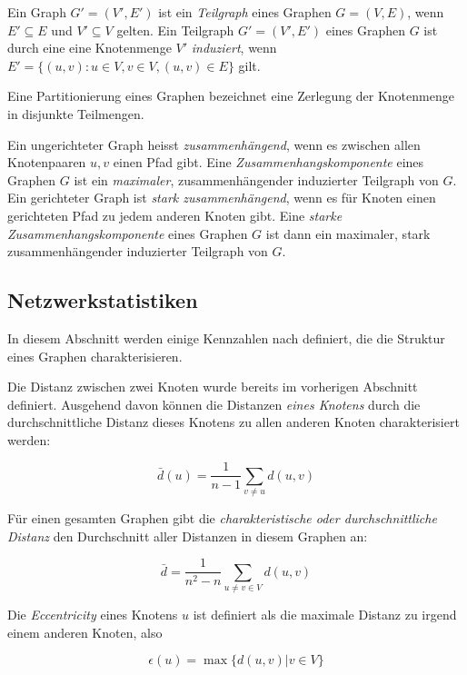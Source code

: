 Ein Graph $G' = (V', E')$ ist ein \emph{Teilgraph} eines Graphen $G =
(V, E)$, wenn $E' \subseteq E$ und $V' \subseteq V$ gelten. Ein
Teilgraph $G' = (V', E')$ eines Graphen $G$ ist durch eine eine
Knotenmenge $V'$ \emph{induziert}, wenn $E' = \{(u, v) : u \in V, v
\in V, (u, v) \in E\}$ gilt.

Eine Partitionierung eines Graphen bezeichnet eine Zerlegung der
Knotenmenge in disjunkte Teilmengen.

Ein ungerichteter Graph heisst \emph{zusammenh\"angend}, wenn es
zwischen allen Knotenpaaren $u, v$ einen Pfad gibt. Eine
\emph{Zusammenhangskomponente} eines Graphen $G$ ist ein
\emph{maximaler}, zusammenh\"angender induzierter Teilgraph von
$G$. Ein gerichteter Graph ist \emph{stark zusammenh\"angend}, wenn es
f\"ur Knoten einen gerichteten Pfad zu jedem anderen Knoten gibt. Eine
\emph{starke Zusammenhangskomponente} eines Graphen $G$ ist dann ein
maximaler, stark zusammenh\"angender induzierter Teilgraph von $G$.

\subsection{Netzwerkstatistiken}
\label{ch:Grundlagen:sec:Netzwerkanalyse:subsec:Statistiken}

In diesem Abschnitt werden einige Kennzahlen nach
\cite{Brinkmeier2004} definiert, die die Struktur eines Graphen
charakterisieren.

Die Distanz zwischen zwei Knoten wurde bereits im vorherigen Abschnitt
definiert. Ausgehend davon k\"onnen die Distanzen \emph{eines Knotens}
durch die durchschnittliche Distanz dieses Knotens zu allen anderen
Knoten charakterisiert werden:

\begin{equation}
  \label{eq:1}
  \bar{d}(u) = \frac{1}{n-1} \sum_{v \ne u} d(u, v)
\end{equation}

F\"ur einen gesamten Graphen gibt die \emph{charakteristische oder
  durchschnittliche Distanz} den Durchschnitt aller Distanzen in
diesem Graphen an:

\begin{equation}
  \label{eq:2}
  \bar{d} = \frac{1}{n^2 - n} \sum_{u \ne v \in V} d(u, v)
\end{equation}

Die \emph{Eccentricity} eines Knotens $u$ ist definiert als die
maximale Distanz zu irgend einem anderen Knoten, also

\begin{equation}
  \label{eq:3}
  \epsilon(u) = \max\{d(u,v) | v \in V\}
\end{equation}

